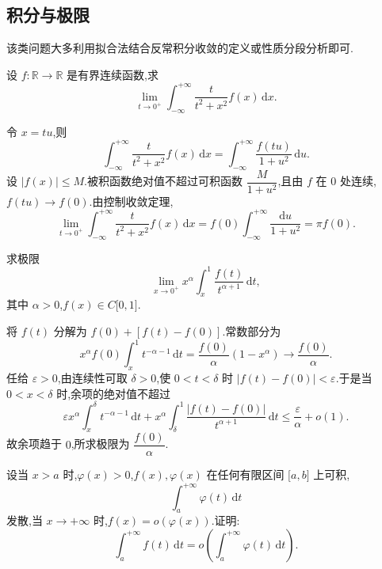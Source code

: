 \subsection{积分与极限}

该类问题大多利用拟合法结合反常积分收敛的定义或性质分段分析即可.

\begin{example}
  设 $f:\mathbb{R}\to\mathbb{R}$ 是有界连续函数,求
  \[
    \lim\limits_{t\to0^+}\int_{-\infty}^{+\infty}\dfrac{t}{t^2+x^2}f(x)\,\mathrm{d}x.
  \]
\end{example}
\exampleblank

\begin{solution}
  令 $x=tu$,则
  \[
    \int_{-\infty}^{+\infty}\dfrac{t}{t^2+x^2}f(x)\,\mathrm{d}x
    =\int_{-\infty}^{+\infty}\dfrac{f(tu)}{1+u^2}\,\mathrm{d}u.
  \]
  设 $|f(x)|\leq M$.被积函数绝对值不超过可积函数
  $\dfrac{M}{1+u^2}$,且由 $f$ 在 $0$ 处连续,$f(tu)\to f(0)$.由控制收敛定理,
  \[
    \lim\limits_{t\to0^+}\int_{-\infty}^{+\infty}
    \dfrac{t}{t^2+x^2}f(x)\,\mathrm{d}x
    =f(0)\int_{-\infty}^{+\infty}\dfrac{\mathrm{d}u}{1+u^2}
    =\pi f(0).
  \]
\end{solution}

\begin{example}
  求极限
  \[
    \lim\limits_{x\to0^+}x^\alpha\int_x^1\dfrac{f(t)}{t^{\alpha+1}}\,\mathrm{d}t,
  \]
  其中 $\alpha>0$,$f(x)\in C\lbrack 0,1\rbrack$.
\end{example}
\exampleblank

\begin{solution}
  将 $f(t)$ 分解为 $f(0)+[f(t)-f(0)]$.常数部分为
  \[
    x^\alpha f(0)\int_x^1t^{-\alpha-1}\,\mathrm{d}t
    =\dfrac{f(0)}{\alpha}(1-x^\alpha)
    \longrightarrow\dfrac{f(0)}{\alpha}.
  \]
  任给 $\varepsilon>0$,由连续性可取 $\delta>0$,使 $0<t<\delta$ 时
  $|f(t)-f(0)|<\varepsilon$.于是当 $0<x<\delta$ 时,余项的绝对值不超过
  \[
    \varepsilon x^\alpha\int_x^\delta t^{-\alpha-1}\,\mathrm{d}t
    +x^\alpha\int_\delta^1\dfrac{|f(t)-f(0)|}{t^{\alpha+1}}\,\mathrm{d}t
    \leq\dfrac{\varepsilon}{\alpha}+o(1).
  \]
  故余项趋于 $0$,所求极限为 $\dfrac{f(0)}{\alpha}$.
\end{solution}

\begin{example}
  设当 $x>a$ 时,$\varphi(x)>0$,$f(x),\varphi(x)$ 在任何有限区间 $\lbrack a,b\rbrack$ 上可积,
  \[
    \int_a^{+\infty}\varphi(t)\,\mathrm{d}t
  \]
  发散,当 $x\to+\infty$ 时,$f(x)=o(\varphi(x))$.证明:
  \[
    \int_a^{+\infty}f(t)\,\mathrm{d}t
    =o\left(\int_a^{+\infty}\varphi(t)\,\mathrm{d}t\right).
  \]
\end{example}
\exampleblank

